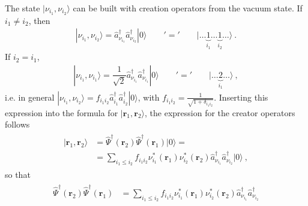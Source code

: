 \documentclass[letterpaper,10pt,english]{jupyterBook}
\begin{document}
\sphinxAtStartPar
{} The state \(| \nu_{i_1}, \nu_{i_2} \rangle\) can be built with creation operators from the vacuum state. If \(i_1 \ne i_2\), then
\begin{equation*}
\begin{split}| \nu_{i_1}, \nu_{i_2} \rangle = \hat{a}^\dagger_{\nu_{i_1}} \hat{a}^\dagger_{\nu_{i_2}} | 0 \rangle \qquad '=' \qquad | \dots \underbrace{1}_{i_1} \dots \underbrace{1}_{i_2} \dots \rangle \ . \end{split}
\end{equation*}
\sphinxAtStartPar
If \(i_2 = i_1\),
\begin{equation*}
\begin{split}| \nu_{i_1}, \nu_{i_1} \rangle = \dfrac{1}{\sqrt{2}} \hat{a}^\dagger_{\nu_{i_1}} \hat{a}^\dagger_{\nu_{i_1}} | 0 \rangle \qquad '=' \qquad | \dots \underbrace{2}_{i_1} \dots \rangle \ , \end{split}
\end{equation*}
\sphinxAtStartPar
i.e. in general \(| \nu_{i_1}, \nu_{i_2} \rangle = f_{i_1 i_2} \hat{a}^\dagger_{i_1} \hat{a}^\dagger_{i_2} | 0 \rangle\), with \(f_{i_1 i_2} = \frac{1}{\sqrt{1 + \delta_{i_1 i_2}}}\). Inserting this expression into the formula for \(| \mathbf{r}_1, \mathbf{r}_2 \rangle\), the expression for the creator operators follows
\begin{equation*}
\begin{split}\begin{aligned}
  | \mathbf{r}_1, \mathbf{r}_2 \rangle
  & = \hat{\Psi}^\dagger(\mathbf{r}_2) \hat{\Psi}^{\dagger}(\mathbf{r}_1) | 0 \rangle = \\
  & = \sum_{i_1 \le i_2} f_{i_1 i_2} \nu_{i_1}^*(\mathbf{r}_1) \nu_{i_2}^*(\mathbf{r}_2) \hat{a}_{\nu_{i_1}}^\dagger \hat{a}_{\nu_{i_2}}^\dagger | 0 \rangle \ ,
\end{aligned}\end{split}
\end{equation*}
\sphinxAtStartPar
so that
\begin{equation*}
\begin{split}\begin{aligned}
  \hat{\Psi}^\dagger(\mathbf{r}_2) \hat{\Psi}^{\dagger}(\mathbf{r}_1) 
  & = \sum_{i_1 \le i_2} f_{i_1 i_2} \nu_{i_1}^*(\mathbf{r}_1) \nu_{i_2}^*(\mathbf{r}_2) \hat{a}_{\nu_{i_1}}^\dagger \hat{a}_{\nu_{i_2}}^\dagger
\end{aligned}\end{split}
\end{equation*}
\sphinxAtStartPar
\end{document}
